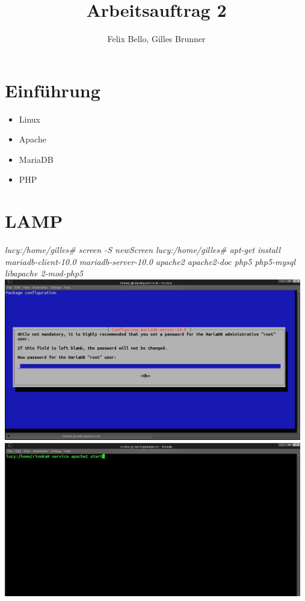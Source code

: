 \documentclass{article}
\author{Felix Bello, Gilles Brunner}
\title{Arbeitsauftrag 2}
\begin{document}
	\maketitle
	\section{Einführung}
	\begin{itemize}
		\item[\Square] Linux
		\item[\Square] Apache
		\item[\Square] MariaDB
		\item[\Square] PHP
	\end{itemize}
	\section{LAMP}
	\textit{lucy:/home/gilles\# screen -S newScreen}
	\newline
	\textit{lucy:/home/gilles\# apt-get install mariadb-client-10.0 mariadb-server-10.0 apache2 apache2-doc php5 php5-mysql libapache 2-mod-php5}
	\newline
	\includegraphics[width=13cm]{../Pics/3-lamp-stack-mariadb}
	\includegraphics[width=13cm]{../Pics/start_apache}
\end{document}
